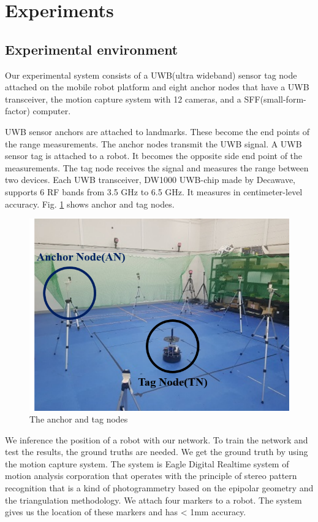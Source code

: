 \documentclass{ieeeaccess}
\begin{document}
\section{Experiments}
\subsection{Experimental environment}

Our experimental system consists of a UWB(ultra wideband) sensor tag node attached on the mobile robot platform and eight anchor nodes that have a UWB transceiver, the motion capture system with 12 cameras, and a SFF(small-form-factor) computer.

UWB sensor anchors are attached to landmarks. These become the end points of the range measurements. The anchor nodes transmit the UWB signal. A UWB sensor tag is attached to a robot. It becomes the opposite side end point of the measurements. The tag node receives the signal and measures the range between two devices. Each UWB transceiver, DW1000 UWB-chip made by Decawave, supports 6 RF bands from 3.5 GHz to 6.5 GHz. It measures in centimeter-level accuracy. Fig. \ref{fig:anchor_tag_nodes} shows anchor and tag nodes.

\begin{figure}[h!]
	\centering
	\includegraphics[width=.9\linewidth]{anchor_tag_nodes}
	\caption{The anchor and tag nodes}
	\label{fig:anchor_tag_nodes}
\end{figure}

We inference the position of a robot with our network. To train the network and test the results, the ground truths are needed. We get the ground truth by using the motion capture system. The system is Eagle Digital Realtime system of motion analysis corporation that operates with the principle of stereo pattern recognition that is a kind of photogrammetry based on the epipolar geometry and the triangulation methodology. We attach four markers to a robot. The system gives us the location of these markers and has < 1mm accuracy.
\end{document}
